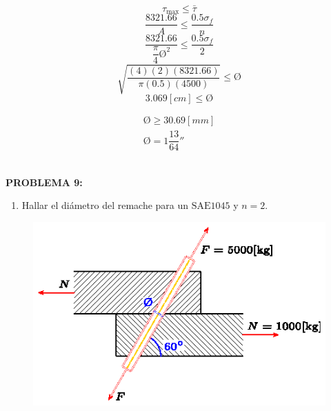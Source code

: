 \documentclass[letter,10pt,twoside]{article}
\begin{document}
\begin{equation*}
    \tau_{\text{max}} \le \bar{\tau}
\end{equation*}
\begin{equation*}
    \frac{8321.66}{A} \le \frac{0.5 \sigma_f}{n}
\end{equation*}
\begin{equation*}
    \frac{8321.66}{\dfrac{\pi}{4} \text{\O}^2} \le \frac{0.5 \sigma_f}{2}
\end{equation*}
\begin{equation*}
    \sqrt{\frac{(4)(2)(8321.66)}{\pi(0.5)(4500)}} \le \text{\O}
\end{equation*}
\begin{equation*}
    3.069[cm] \le \text{\O}
\end{equation*}

\begin{equation*}
\boxed{
    \boxed{
        \begin{array}{l}
            \text{\O} \ge 30.69[mm] \\
            \text{\O} = 1\dfrac{13}{64}''
        \end{array}
    }
}
\end{equation*}
\\

\newpage

\colorbox{blue!25}{\textbf{PROBLEMA 9:}}

\begin{enumerate}[label=\alph*)]
    \item Hallar el diámetro del remache para un $\text{SAE1045}$ y $n = 2$.
\end{enumerate}

\begin{figure}[H]
\centering
\includegraphics[scale=1.6]{resources/f94.eps}
\end{figure}
\end{document}
